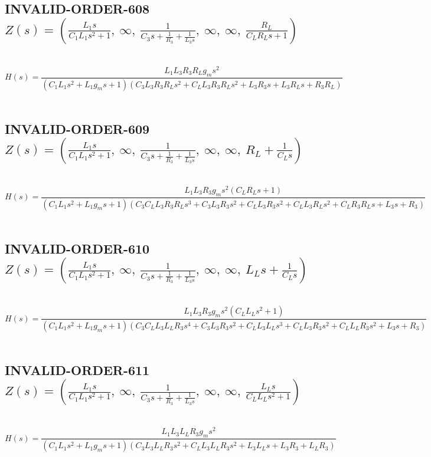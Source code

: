 \documentclass{article}
\begin{document}
\subsection{INVALID-ORDER-608 $Z(s) = \left( \frac{L_{1} s}{C_{1} L_{1} s^{2} + 1}, \  \infty, \  \frac{1}{C_{3} s + \frac{1}{R_{3}} + \frac{1}{L_{3} s}}, \  \infty, \  \infty, \  \frac{R_{L}}{C_{L} R_{L} s + 1}\right)$ } \ 
\textbf{\[H(s) = \frac{L_{1} L_{3} R_{3} R_{L} g_{m} s^{2}}{\left(C_{1} L_{1} s^{2} + L_{1} g_{m} s + 1\right) \left(C_{3} L_{3} R_{3} R_{L} s^{2} + C_{L} L_{3} R_{3} R_{L} s^{2} + L_{3} R_{3} s + L_{3} R_{L} s + R_{3} R_{L}\right)}\] } \ 
\subsection{INVALID-ORDER-609 $Z(s) = \left( \frac{L_{1} s}{C_{1} L_{1} s^{2} + 1}, \  \infty, \  \frac{1}{C_{3} s + \frac{1}{R_{3}} + \frac{1}{L_{3} s}}, \  \infty, \  \infty, \  R_{L} + \frac{1}{C_{L} s}\right)$ } \ 
\textbf{\[H(s) = \frac{L_{1} L_{3} R_{3} g_{m} s^{2} \left(C_{L} R_{L} s + 1\right)}{\left(C_{1} L_{1} s^{2} + L_{1} g_{m} s + 1\right) \left(C_{3} C_{L} L_{3} R_{3} R_{L} s^{3} + C_{3} L_{3} R_{3} s^{2} + C_{L} L_{3} R_{3} s^{2} + C_{L} L_{3} R_{L} s^{2} + C_{L} R_{3} R_{L} s + L_{3} s + R_{3}\right)}\] } \ 
\subsection{INVALID-ORDER-610 $Z(s) = \left( \frac{L_{1} s}{C_{1} L_{1} s^{2} + 1}, \  \infty, \  \frac{1}{C_{3} s + \frac{1}{R_{3}} + \frac{1}{L_{3} s}}, \  \infty, \  \infty, \  L_{L} s + \frac{1}{C_{L} s}\right)$ } \ 
\textbf{\[H(s) = \frac{L_{1} L_{3} R_{3} g_{m} s^{2} \left(C_{L} L_{L} s^{2} + 1\right)}{\left(C_{1} L_{1} s^{2} + L_{1} g_{m} s + 1\right) \left(C_{3} C_{L} L_{3} L_{L} R_{3} s^{4} + C_{3} L_{3} R_{3} s^{2} + C_{L} L_{3} L_{L} s^{3} + C_{L} L_{3} R_{3} s^{2} + C_{L} L_{L} R_{3} s^{2} + L_{3} s + R_{3}\right)}\] } \ 
\subsection{INVALID-ORDER-611 $Z(s) = \left( \frac{L_{1} s}{C_{1} L_{1} s^{2} + 1}, \  \infty, \  \frac{1}{C_{3} s + \frac{1}{R_{3}} + \frac{1}{L_{3} s}}, \  \infty, \  \infty, \  \frac{L_{L} s}{C_{L} L_{L} s^{2} + 1}\right)$ } \ 
\textbf{\[H(s) = \frac{L_{1} L_{3} L_{L} R_{3} g_{m} s^{2}}{\left(C_{1} L_{1} s^{2} + L_{1} g_{m} s + 1\right) \left(C_{3} L_{3} L_{L} R_{3} s^{2} + C_{L} L_{3} L_{L} R_{3} s^{2} + L_{3} L_{L} s + L_{3} R_{3} + L_{L} R_{3}\right)}\] } \ 
\end{document}
